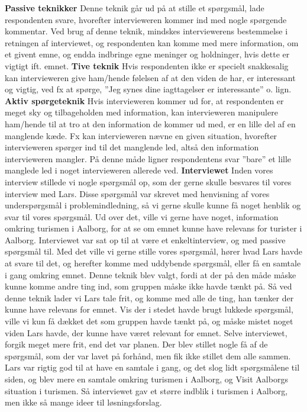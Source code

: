 \textbf{Passive teknikker}
Denne teknik går ud på at stille et spørgsmål, lade respondenten svare, hvorefter intervieweren kommer ind med nogle spørgende kommentar. Ved brug af denne teknik, mindskes interviewerens bestemmelse i retningen af interviewet, og respondenten kan komme med mere information, om et givent emne, og endda indbringe egne meninger og holdninger, hvis dette er vigtigt ift. emnet.
\textbf{Tive teknik}
Hvis respondenten ikke er specielt snakkesalig kan intervieweren give ham/hende følelsen af at den viden de har, er interessant og vigtig, ved fx at spørge, ”Jeg synes dine iagttagelser er interessante” o. lign.
\textbf{Aktiv spørgeteknik}
Hvis intervieweren kommer ud for, at respondenten er meget sky og tilbageholden med information, kan intervieweren manipulere ham/hende til at tro at den information de kommer ud med, er en lille del af en manglende kæde. Fx kan intervieweren nævne en given situation, hvorefter intervieweren spørger ind til det manglende led, altså den information intervieweren mangler. På denne måde ligner respondentens svar ”bare” et lille manglede led i noget intervieweren allerede ved.
\textbf{Interviewet}
Inden vores interview stillede vi nogle spørgsmål op, som der gerne skulle besvares til vores interview med Lars. Disse spørgsmål var skrevet med henvisning af vores underspørgsmål i problemindledning, så vi gerne skulle kunne få noget henblik og svar til vores spørgsmål. Ud over det, ville vi gerne have noget, information omkring turismen i Aalborg, for at se om emnet kunne have relevans for turister i Aalborg. 
Interviewet var sat op til at være et enkeltinterview, og med passive spørgsmål til. Med det ville vi gerne stille vores spørgsmål, hører hvad Lars havde at svare til det, og herefter komme med uddybende spørgsmål, eller få en samtale i gang omkring emnet. Denne teknik blev valgt, fordi at der på den måde måske kunne komme andre ting ind, som gruppen måske ikke havde tænkt på. Så ved denne teknik lader vi Lars tale frit, og komme med alle de ting, han tænker der kunne have relevans for emnet. Vis der i stedet havde brugt lukkede spørgsmål, ville vi kun få dækket det som gruppen havde tænkt på, og måske mistet noget viden Lars havde, der kunne have været relevant for emnet. 
Selve interviewet, forgik meget mere frit, end det var planen. Der blev stillet nogle få af de spørgsmål, som der var lavet på forhånd, men fik ikke stillet dem alle sammen. Lars var rigtig god til at have en samtale i gang, og det slog lidt spørgsmålene til siden, og blev mere en samtale omkring turismen i Aalborg, og Visit Aalborgs situation i turismen. Så interviewet gav et større indblik i turismen i Aalborg, men ikke så mange ideer til løsningsforslag.